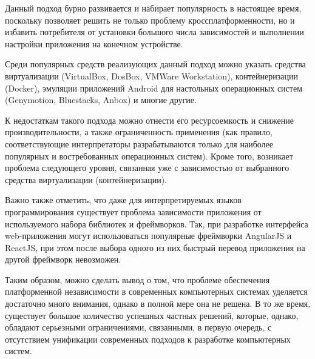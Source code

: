 \begin{textitemize}
	Данный подход бурно развивается и набирает популярность в настоящее время, поскольку позволяет решить не только проблему кроссплатформенности, но и избавить потребителя от установки большого числа зависимостей и выполнении настройки приложения на конечном устройстве.
	
	Среди популярных средств реализующих данный подход можно указать средства виртуализации (VirtualBox, DosBox, VMWare Workstation), контейнеризации (Docker), эмуляции приложений Android для настольных операционных систем (Genymotion, Bluestacks, Anbox) и многие другие.
	
	К недостаткам такого подхода можно отнести его ресурсоемкость и снижение производительности, а также ограниченность применения (как правило, соответствующие интерпретаторы разрабатываются только для наиболее популярных и востребованных операционных систем). Кроме того, возникает проблема следующего уровня, связанная уже с зависимостью от выбранного средства виртуализации (контейнеризации).
\end{textitemize}

Важно также отметить, что даже для интерпретируемых языков программирования существует проблема зависимости приложения от используемого набора библиотек и фреймворков. Так, при разработке интерфейса web-приложения могут использоваться популярные фреймворки AngularJS и ReactJS, при этом после выбора одного из них быстрый перевод приложения на другой фреймворк невозможен.

Таким образом, можно сделать вывод о том, что проблеме обеспечения платформенной независимости в современных компьютерных системах уделяется достаточно много внимания, однако в полной мере она не решена. В то же время, существует большое количество успешных частных решений, которые, однако, обладают серьезными ограничениями, связанными, в первую очередь, с отсутствием унификации современных подходов к разработке компьютерных систем. 

